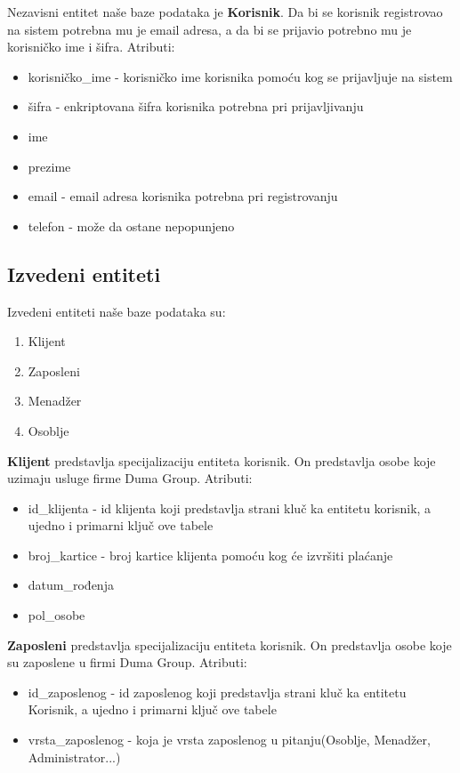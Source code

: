 \documentclass[a4paper]{article}
\begin{document}
Nezavisni entitet naše baze podataka je \textbf{Korisnik}. Da bi se korisnik registrovao na sistem potrebna mu je email adresa, a da bi se prijavio potrebno mu je korisničko ime i šifra. Atributi:
\begin{itemize}
    \item korisničko\_ime - korisničko ime korisnika pomoću kog se prijavljuje na sistem
    \item šifra - enkriptovana šifra korisnika potrebna pri prijavljivanju
    \item ime
    \item prezime
    \item email - email adresa korisnika potrebna pri registrovanju
    \item telefon - može da ostane nepopunjeno
\end{itemize}


\subsection{Izvedeni entiteti}

Izvedeni entiteti naše baze podataka su:
\begin{enumerate}
    \item Klijent
    \item Zaposleni
    \item Menadžer
    \item Osoblje
\end{enumerate}

\vspace{3mm}

\textbf{Klijent} predstavlja specijalizaciju entiteta korisnik. On predstavlja osobe koje uzimaju usluge firme Duma Group. Atributi:
\begin{itemize}
    \item id\_klijenta - id klijenta koji predstavlja strani kluč ka entitetu korisnik, a ujedno i primarni ključ ove tabele
    \item broj\_kartice - broj kartice klijenta pomoću kog će izvršiti plaćanje
    \item datum\_rođenja
    \item pol\_osobe
\end{itemize}

\vspace{3mm}

\textbf{Zaposleni} predstavlja specijalizaciju entiteta korisnik. On predstavlja osobe koje su zaposlene u firmi Duma Group. Atributi:
\begin{itemize}
    \item id\_zaposlenog - id zaposlenog koji predstavlja strani kluč ka entitetu Korisnik, a ujedno i primarni ključ ove tabele
    \item vrsta\_zaposlenog - koja je vrsta zaposlenog u pitanju(Osoblje, Menadžer, Administrator...)
\end{itemize}
\end{document}

